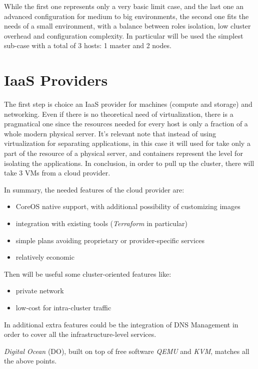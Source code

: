 While the first one represents only a very basic limit case, and the last one an advanced configuration for medium to big environments, the second one fits the needs of a small environment, with a balance between roles isolation, low cluster overhead and configuration complexity.  In particular will be used the simplest sub-case with a total of 3 hosts:  1 master and 2 nodes.

\section{IaaS Providers}\label{iaas-providers}

The first step is choice an IaaS provider for machines (compute and storage) and networking.  Even if there is no theoretical need of virtualization, there is a pragmatical one since the resources needed for every host is only a fraction of a whole modern physical server.  It's relevant note that instead of using virtualization for separating applications, in this case it will used for take only a part of the resource of a physical server, and containers represent the level for isolating the applications.  In conclusion, in order to pull up the cluster, there will take 3 VMs from a cloud provider.

In summary, the needed features of the cloud provider are:
\begin{itemize}
\item CoreOS native support, with additional possibility of customizing images
\item integration with existing tools (\textit{Terraform} in particular)
\item simple plans avoiding proprietary or provider-specific services
\item relatively economic
\end{itemize}

Then will be useful some cluster-oriented features like:
\begin{itemize}
\item private network
\item low-cost for intra-cluster traffic
\end{itemize}

In additional extra features could be the integration of DNS Management in order to cover all the infrastructure-level services.

\textit{Digital Ocean} (DO), built on top of free software \textit{QEMU} and \textit{KVM}, matches all the above points.

